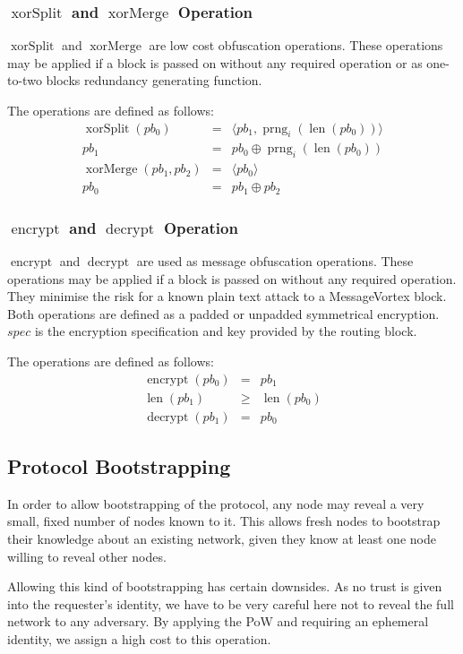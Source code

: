 \documentclass[9pt,journal,compsoc]{IEEEtran}
\DeclareMathOperator{\prng}{prng}
\DeclareMathOperator{\len}{len}
\DeclareMathOperator{\xorSplit}{xorSplit}
\DeclareMathOperator{\xorMerge}{xorMerge}
\DeclareMathOperator{\encrypt}{encrypt}
\DeclareMathOperator{\decrypt}{decrypt}
\begin{document}
\subsubsection{$\xorSplit$ and $\xorMerge$ Operation}
$\xorSplit$ and $\xorMerge$ are low cost obfuscation operations. These operations may be applied if a block is passed on without any required operation or as one-to-two blocks redundancy generating function. 

The operations are defined as follows:
\begin{eqnarray}
\xorSplit(pb_0) & = &\langle pb_1, \prng_i(\len(pb_0)) \rangle\\
pb_1 & = & pb_0 \oplus \prng_i(\len(pb_0))\\
\xorMerge(pb_1,pb_2) & = &\langle pb_0 \rangle\\
pb_0 & = & pb_1 \oplus pb_2
\end{eqnarray}

\subsubsection{$\encrypt$ and $\decrypt$ Operation}
$\encrypt$ and $\decrypt$ are used as message obfuscation operations. These operations may be applied if a block is passed on without any required operation. They minimise the risk for a known plain text attack to a MessageVortex block. Both operations are defined as a padded or unpadded symmetrical encryption. $spec$ is the encryption specification and key provided by the routing block.

The operations are defined as follows:
\begin{eqnarray}
\encrypt(pb_0) & = & pb_1 \\
\len(pb_1) & \geq & \len(pb_0)\\
\decrypt(pb_1) & = & pb_0
\end{eqnarray}

\subsection{Protocol Bootstrapping}
In order to allow bootstrapping of the protocol, any node may reveal a very small, fixed number of nodes known to it. This allows fresh nodes to bootstrap their knowledge about an existing network, given they know at least one node willing to reveal other nodes. 

Allowing this kind of bootstrapping has certain downsides. As no trust is given into the requester's identity, we have to be very careful here not to reveal the full network to any adversary. By applying the PoW and requiring an ephemeral identity, we assign a high cost to this operation. 
\end{document}
